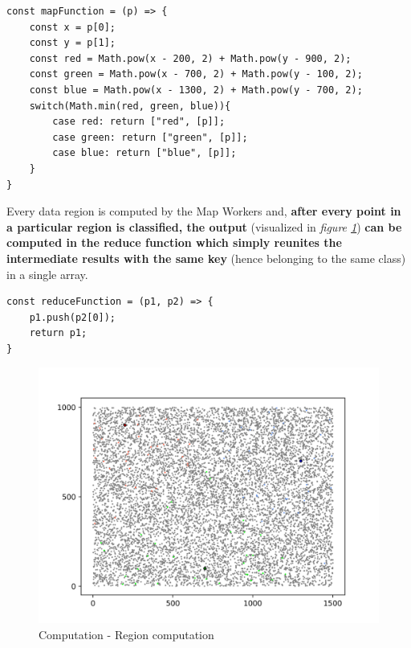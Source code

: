 \begin{lstlisting}[caption={Map function},captionpos=b]
const mapFunction = (p) => {
    const x = p[0];
    const y = p[1];
    const red = Math.pow(x - 200, 2) + Math.pow(y - 900, 2);
    const green = Math.pow(x - 700, 2) + Math.pow(y - 100, 2);
    const blue = Math.pow(x - 1300, 2) + Math.pow(y - 700, 2);
    switch(Math.min(red, green, blue)){
        case red: return ["red", [p]];
        case green: return ["green", [p]];
        case blue: return ["blue", [p]];
    }
}
\end{lstlisting}

Every data region is computed by the Map Workers and, \textbf{after every point in a particular region is classified, the output} (visualized in \textit{figure \ref{fig:computation_region_computation}}) \textbf{can be computed in the reduce function which simply reunites the intermediate results with the same key} (hence belonging to the same class) in a single array.

\begin{lstlisting}[caption={Reduce function},captionpos=b]
const reduceFunction = (p1, p2) => {
    p1.push(p2[0]);
    return p1;
}
\end{lstlisting}

\begin{figure}[!ht]
    \centering
    \includegraphics[width=\linewidth]{document/chapters/chapter_7/images/computation_region_computation.png}
    \caption{Computation - Region computation}
    \label{fig:computation_region_computation}
\end{figure}

